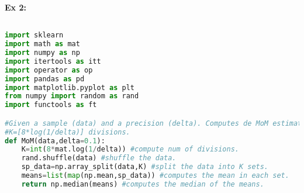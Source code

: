 \documentclass[11pt, english]{article}
\begin{document}
\textbf{Ex 2:}

\begin{lstlisting}[language=Python]

import sklearn
import math as mat
import numpy as np
import itertools as itt
import operator as op
import pandas as pd
import matplotlib.pyplot as plt
from numpy import random as rand
import functools as ft

#Given a sample (data) and a precision (delta). Computes de MoM estimator with 
#K=[8*log(1/delta)] divisions.
def MoM(data,delta=0.1):
	K=int(8*mat.log(1/delta)) #compute num of divisions.
	rand.shuffle(data) #shuffle the data.
	sp_data=np.array_split(data,K) #split the data into K sets. 
	means=list(map(np.mean,sp_data)) #computes the mean in each set.
	return np.median(means) #computes the median of the means.



\end{lstlisting}
\end{document}
